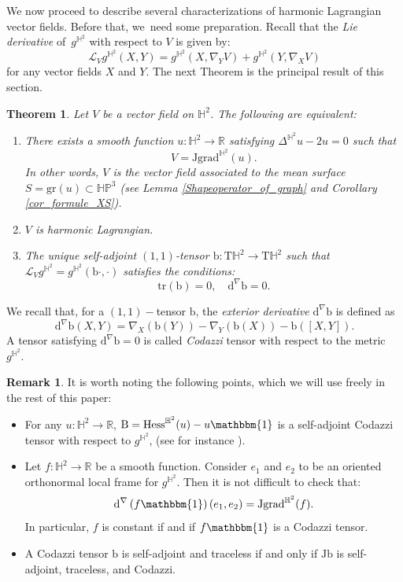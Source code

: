 \documentclass[JEP,XML,SOM,Unicode,NoEqCountersInSection, NoFloatCountersInSection,published]{cedram}
\theoremstyle{plain}
\newtheorem{theorem}[cor]{Theorem}
\theoremstyle{definition}
\newtheorem{remark}[cor]{Remark}
\newcommand{\bb}{\mathrm{b}}
\newcommand{\HP}{\mathbb{HP}^3}
\newcommand{\grad}{\mathrm{grad}^{\mathbb{H}^2}}
\newcommand{\hess}{\mathrm{Hess}^{\mathbb{H}^2}}
\newcommand{\J}{\mathrm{J}}
\newcommand{\B}{\mathrm{B}}
\begin{document}
We now proceed to describe several characterizations of harmonic Lagrangian vector fields. Before that, we~need some preparation.
Recall that the \emph{Lie derivative} of~$g^{\mathbb{H}^2}$ with respect to $V$ is given by:
\[
\mathcal{L}_Vg^{\mathbb{H}^2}(X,Y)=g^{\mathbb{H}^2}(X,\nabla_YV)+g^{\mathbb{H}^2}(Y,\nabla_X V)
\]
for any vector fields $X$ and $Y$.
The next Theorem is the principal result of this section.
\begin{theorem}\label{charac_HL}
Let $V$ be a vector field on $\mathbb{H}^2$. The following are equivalent:
\begin{enumerate}
\item \label{charac_HL1} There exists a smooth function $u:\mathbb{H}^2\to\mathbb{R}$ satisfying $\Delta^{\mathbb{H}^2} u-2u=0$ such that
\[
V=\J\grad(u).
\]
In other words, $V$ is the vector field associated to the mean surface $S=\mathrm{gr}(u)\subset\HP$ (see Lemma \ref{Shapeoperator_of_graph} and Corollary \ref{cor_formule_XS}).
\item \label{charac_HL2} $V$ is harmonic Lagrangian.
\item \label{charac_HL3} The unique self-adjoint $(1, 1)$-tensor $\bb:\mathrm{T}\mathbb{H}^2\to \mathrm{T}\mathbb{H}^2$ such that $\mathcal{L}_Vg^{\mathbb{H}^2}=g^{\mathbb{H}^2}(\bb\cdot,\cdot)$ satisfies the conditions:\begin{equation}\label{condition_harmonic_lagrangian}
\mathrm{tr}(\bb)=0,\quad \mathrm{d}^{\nabla}\bb=0.
\end{equation}
\end{enumerate}
\end{theorem}
We recall that, for a $(1,1)-$tensor $\bb$, the \emph{exterior derivative} $\mathrm{d}^{\nabla}\bb$ is defined as
\[
\mathrm{d}^{\nabla}\bb(X,Y) = \nabla_X(\bb(Y)) -\nabla_Y(\bb(X))-\bb([X, Y]).
\]
A tensor satisfying $\mathrm{d}^{\nabla}\bb=0$ is called \emph{Codazzi} tensor with respect to the metric $g^{\mathbb{H}^2}$.
\begin{remark}\label{remark_on_codazzi}
It is worth noting the following points, which we will use freely in the rest of this paper:
\begin{itemize}
\item For any $u:\mathbb{H}^2\to\mathbb{R}$, $\B=\hess(u)-u\mathbbm{1}$ is a self-adjoint Codazzi tensor with respect to $g^{\mathbb{H}^2}$, (see for instance \cite[Lem.\,2.1]{BS_flat_conical}).
\item Let $f:\mathbb{H}^2\to\mathbb{R}$ be a smooth function. Consider $e_1$ and $e_2$ to be an oriented orthonormal local frame
for $g^{\mathbb{H}^2}$. Then it is not difficult to check that:
\[
\mathrm{d}^{\nabla}\left(f\mathbbm{1} \right)(e_1,e_2)=\J\grad(f).
\]
In particular, $f$ is constant if and if $f\mathbbm{1}$ is a Codazzi tensor.

\item A Codazzi tensor $\bb$ is self-adjoint and traceless if and only if $\J\bb$ is self-adjoint, traceless, and Codazzi.
\end{itemize}
\end{remark}
\end{document}
